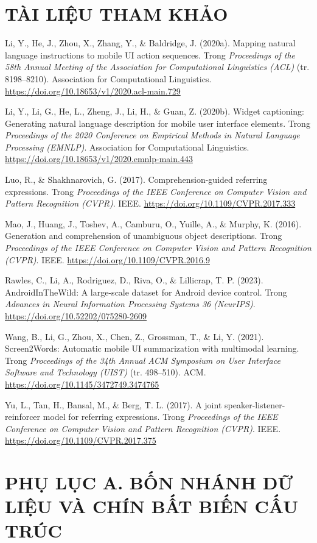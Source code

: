 \documentclass[12pt,a4paper,onecolumn]{article}
\newcommand{\ôvuông}[2]{\tikz[baseline=-0.45ex]{\draw[#1,line width=0.9pt,#2] (0,0) rectangle (0.34,0.18);}}
\newenvironment{apareferences}{%
  \newpage
  \section*{TÀI LIỆU THAM KHẢO}%
  \setstretch{1.0}%
  \sloppy%
  \setlength{\parindent}{0pt}%
  \setlength{\parskip}{6pt plus 1pt}%
  \begin{list}{}{%
    \setlength{\leftmargin}{36pt}%
    \setlength{\itemindent}{-36pt}%
    \setlength{\listparindent}{0pt}%
    \setlength{\labelwidth}{0pt}%
    \setlength{\labelsep}{0pt}%
    \setlength{\itemsep}{6pt}%
    \setlength{\parsep}{0pt}%
    \setlength{\topsep}{0pt}}%
}{\end{list}}
\newcommand{\apaitem}{\item[]}
\begin{document}
\begin{apareferences}
\apaitem Li, Y., He, J., Zhou, X., Zhang, Y., \& Baldridge, J. (2020a). Mapping natural
language instructions to mobile UI action sequences. Trong \emph{Proceedings of the 58th
Annual Meeting of the Association for Computational Linguistics (ACL)} (tr. 8198--8210).
Association for Computational Linguistics.
\url{https://doi.org/10.18653/v1/2020.acl-main.729}

\apaitem Li, Y., Li, G., He, L., Zheng, J., Li, H., \& Guan, Z. (2020b). Widget captioning:
Generating natural language description for mobile user interface elements. Trong
\emph{Proceedings of the 2020 Conference on Empirical Methods in Natural Language
Processing (EMNLP)}. Association for Computational Linguistics.
\url{https://doi.org/10.18653/v1/2020.emnlp-main.443}

\apaitem Luo, R., \& Shakhnarovich, G. (2017). Comprehension-guided referring expressions.
Trong \emph{Proceedings of the IEEE Conference on Computer Vision and Pattern Recognition
(CVPR)}. IEEE.
\url{https://doi.org/10.1109/CVPR.2017.333}

\apaitem Mao, J., Huang, J., Toshev, A., Camburu, O., Yuille, A., \& Murphy, K. (2016).
Generation and comprehension of unambiguous object descriptions. Trong \emph{Proceedings of
the IEEE Conference on Computer Vision and Pattern Recognition (CVPR)}. IEEE.
\url{https://doi.org/10.1109/CVPR.2016.9}

\apaitem Rawles, C., Li, A., Rodriguez, D., Riva, O., \& Lillicrap, T. P. (2023).
AndroidInTheWild: A large-scale dataset for Android device control. Trong \emph{Advances in
Neural Information Processing Systems 36 (NeurIPS)}.
\url{https://doi.org/10.52202/075280-2609}

\apaitem Wang, B., Li, G., Zhou, X., Chen, Z., Grossman, T., \& Li, Y. (2021).
Screen2Words: Automatic mobile UI summarization with multimodal learning. Trong
\emph{Proceedings of the 34th Annual ACM Symposium on User Interface Software and
Technology (UIST)} (tr. 498--510). ACM.
\url{https://doi.org/10.1145/3472749.3474765}

\apaitem Yu, L., Tan, H., Bansal, M., \& Berg, T. L. (2017). A joint speaker-listener-%
reinforcer model for referring expressions. Trong \emph{Proceedings of the IEEE Conference
on Computer Vision and Pattern Recognition (CVPR)}. IEEE.
\url{https://doi.org/10.1109/CVPR.2017.375}

\end{apareferences}

\section*{PHỤ LỤC A. BỐN NHÁNH DỮ LIỆU VÀ CHÍN BẤT BIẾN CẤU TRÚC}
\label{sec:phuluc}
\end{document}
